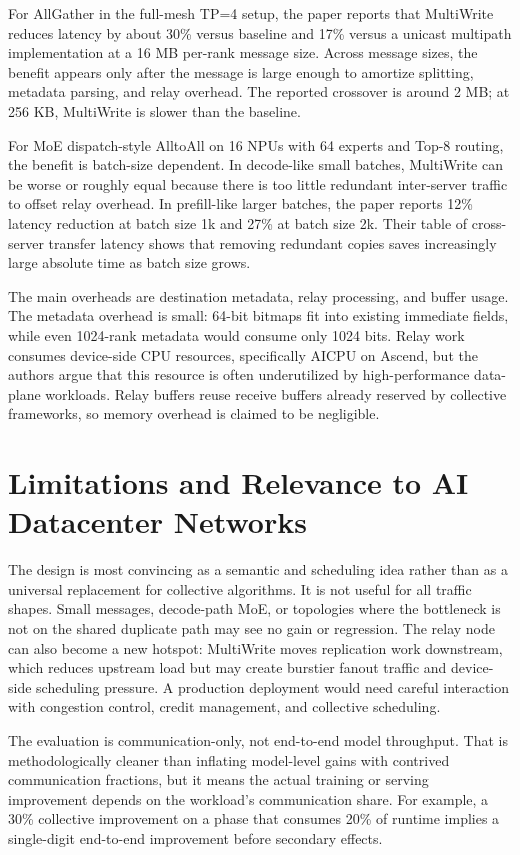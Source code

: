 \documentclass[10pt]{article}
\begin{document}
For AllGather in the full-mesh TP=4 setup, the paper reports that MultiWrite reduces latency by about 30\% versus baseline and 17\% versus a unicast multipath implementation at a 16 MB per-rank message size. Across message sizes, the benefit appears only after the message is large enough to amortize splitting, metadata parsing, and relay overhead. The reported crossover is around 2 MB; at 256 KB, MultiWrite is slower than the baseline.

For MoE dispatch-style AlltoAll on 16 NPUs with 64 experts and Top-8 routing, the benefit is batch-size dependent. In decode-like small batches, MultiWrite can be worse or roughly equal because there is too little redundant inter-server traffic to offset relay overhead. In prefill-like larger batches, the paper reports 12\% latency reduction at batch size 1k and 27\% at batch size 2k. Their table of cross-server transfer latency shows that removing redundant copies saves increasingly large absolute time as batch size grows.

The main overheads are destination metadata, relay processing, and buffer usage. The metadata overhead is small: 64-bit bitmaps fit into existing immediate fields, while even 1024-rank metadata would consume only 1024 bits. Relay work consumes device-side CPU resources, specifically AICPU on Ascend, but the authors argue that this resource is often underutilized by high-performance data-plane workloads. Relay buffers reuse receive buffers already reserved by collective frameworks, so memory overhead is claimed to be negligible.

\section{Limitations and Relevance to AI Datacenter Networks}

The design is most convincing as a semantic and scheduling idea rather than as a universal replacement for collective algorithms. It is not useful for all traffic shapes. Small messages, decode-path MoE, or topologies where the bottleneck is not on the shared duplicate path may see no gain or regression. The relay node can also become a new hotspot: MultiWrite moves replication work downstream, which reduces upstream load but may create burstier fanout traffic and device-side scheduling pressure. A production deployment would need careful interaction with congestion control, credit management, and collective scheduling.

The evaluation is communication-only, not end-to-end model throughput. That is methodologically cleaner than inflating model-level gains with contrived communication fractions, but it means the actual training or serving improvement depends on the workload's communication share. For example, a 30\% collective improvement on a phase that consumes 20\% of runtime implies a single-digit end-to-end improvement before secondary effects.
\end{document}
